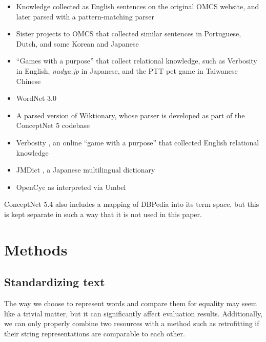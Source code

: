 \documentclass[letterpaper]{article}
\begin{document}
\begin{itemize}
\item Knowledge collected as English sentences on the original OMCS website,
    and later parsed with a pattern-matching parser
\item Sister projects to OMCS that collected similar sentences in Portuguese,
    Dutch, and some Korean and Japanese \cite{anacleto2006portuguese}
    \cite{eckhardt2008dutch} \cite{TODO-globalmind}
\item ``Games with a purpose'' that collect relational knowledge, such as
    Verbosity \cite{vonahn2006verbosity} in English, {\em nadya.jp}
    \cite{TODOnadya} in Japanese, and the PTT pet game \cite{kuo2009petgame}
    in Taiwanese Chinese
\item WordNet 3.0 \cite{fellbaum1998wordnet}
\item A parsed version of Wiktionary, whose parser is developed as part of the
    ConceptNet 5 codebase
\item Verbosity \cite{suranaTODOverbosity}, an online ``game with a purpose''
    that collected English relational knowledge
\item JMDict \cite{TODOjmdict}, a Japanese multilingual dictionary
\item OpenCyc \cite{TODOcyc} as interpreted via Umbel \cite{TODOumbel}
\end{itemize}

ConceptNet 5.4 also includes a mapping of DBPedia \cite{auer2007dbpedia} into
its term space, but this is kept separate in such a way that it is not used
in this paper.



\section{Methods}

\subsection{Standardizing text}


The way we choose to represent words and compare them for equality may seem
like a trivial matter, but it can significantly affect evaluation results.
Additionally, we can only properly combine two resources with a method such
as retrofitting if their string representations are comparable to each other.
\end{document}
